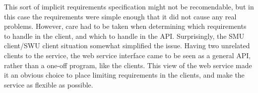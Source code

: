 This sort of implicit requirements specification might not be recomendable, but
in this case the requirements were simple enough that it did not cause any real
problems. However, care had to be taken when determining which requirements to
handle in the client, and which to handle in the API. Surprisingly, the SMU
client/SWU client situation somewhat simplified the issue. Having two unrelated
clients to the service, the web service interface came to be seen as a general
API, rather than a one-off program, like the clients. This view of the web
service made it an obvious choice to place limiting requirements in the
clients, and make the service as flexible as possible.
